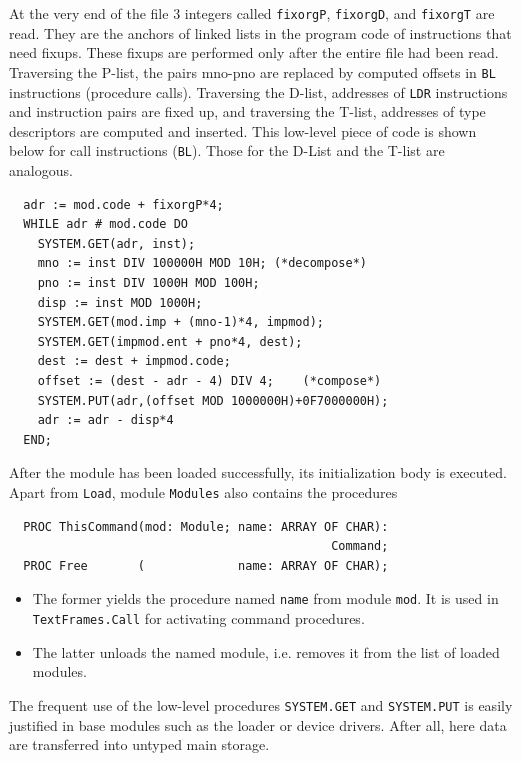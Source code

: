 At the very end of the file
3 integers called \verb|fixorgP|, \verb|fixorgD|, and \verb|fixorgT| are read.
They are the anchors of linked lists in the program code of instructions that need fixups.
These fixups are performed only after the entire file had been read.
Traversing the P-list, the pairs mno-pno are replaced by computed offsets
in \verb|BL| instructions (procedure calls).
Traversing the D-list, addresses of \verb|LDR| instructions and instruction pairs are fixed up,
and traversing the T-list, addresses of type descriptors are computed and inserted.
This low-level piece of code is shown below for call instructions (\verb|BL|).
Those for the D-List and the T-list are analogous.
\begin{verbatim}
  adr := mod.code + fixorgP*4;
  WHILE adr # mod.code DO
    SYSTEM.GET(adr, inst);
    mno := inst DIV 100000H MOD 10H; (*decompose*)
    pno := inst DIV 1000H MOD 100H;
    disp := inst MOD 1000H;
    SYSTEM.GET(mod.imp + (mno-1)*4, impmod);
    SYSTEM.GET(impmod.ent + pno*4, dest);
    dest := dest + impmod.code;
    offset := (dest - adr - 4) DIV 4;    (*compose*)
    SYSTEM.PUT(adr,(offset MOD 1000000H)+0F7000000H);
    adr := adr - disp*4
  END;
\end{verbatim}
After the module has been loaded successfully, its initialization body is executed.
Apart from \verb|Load|, module \verb|Modules| also contains the procedures
\begin{verbatim}
  PROC ThisCommand(mod: Module; name: ARRAY OF CHAR):
                                             Command;
  PROC Free       (             name: ARRAY OF CHAR);
\end{verbatim}
\begin{itemize}
  \item The former yields the procedure named \verb|name| from module \verb|mod|.
    It is used in \verb|TextFrames.Call| for activating command procedures.
  \item The latter unloads the named module, i.e. removes it from the list of loaded modules.
\end{itemize}

The frequent use of the low-level procedures \verb|SYSTEM.GET| and \verb|SYSTEM.PUT|
is easily justified in base modules such as the loader or device drivers.
After all, here data are transferred into untyped main storage.

